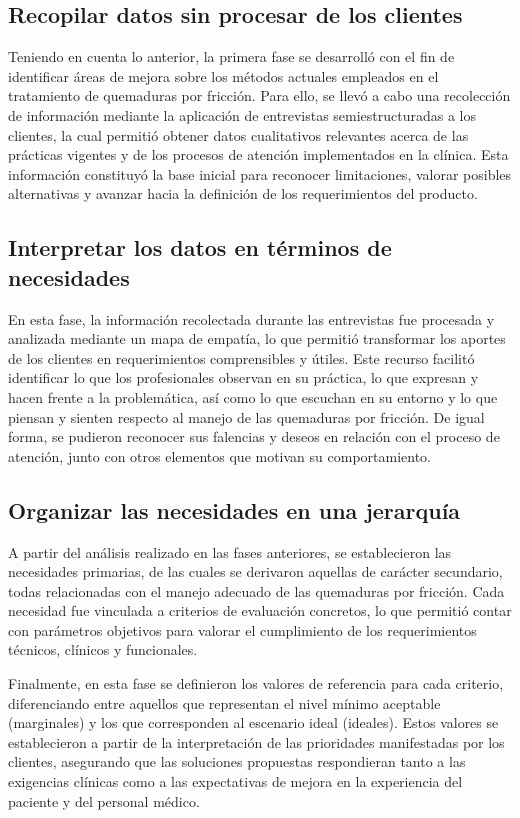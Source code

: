 \documentclass[../../DocumentoCompleto.tex]{subfiles}
\begin{document}
  \subsection{Recopilar datos sin procesar de los clientes}
Teniendo en cuenta lo anterior, la primera fase se desarrolló con el fin de identificar áreas de mejora sobre los métodos actuales empleados en el tratamiento de quemaduras por fricción. Para ello, se llevó a cabo una recolección de información mediante la aplicación de entrevistas semiestructuradas a los clientes, la cual permitió obtener datos cualitativos relevantes acerca de las prácticas vigentes y de los procesos de atención implementados en la clínica. Esta información constituyó la base inicial para reconocer limitaciones, valorar posibles alternativas y avanzar hacia la definición de los requerimientos del producto.
  
  \subsection{Interpretar los datos en términos de necesidades}
En esta fase, la información recolectada durante las entrevistas fue procesada y analizada mediante un mapa de empatía, lo que permitió transformar los aportes de los clientes en requerimientos comprensibles y útiles. Este recurso facilitó identificar lo que los profesionales observan en su práctica, lo que expresan y hacen frente a la problemática, así como lo que escuchan en su entorno y lo que piensan y sienten respecto al manejo de las quemaduras por fricción. De igual forma, se pudieron reconocer sus falencias y deseos en relación con el proceso de atención, junto con otros elementos que motivan su comportamiento.
  
  \subsection{Organizar las necesidades en una jerarquía}
  
     A partir del análisis realizado en las fases anteriores, se establecieron las necesidades primarias, de las cuales se derivaron aquellas de carácter secundario, todas relacionadas con el manejo adecuado de las quemaduras por fricción. Cada necesidad fue vinculada a criterios de evaluación concretos, lo que permitió contar con parámetros objetivos para valorar el cumplimiento de los requerimientos técnicos, clínicos y funcionales.

    Finalmente, en esta fase se definieron los valores de referencia para cada criterio, diferenciando entre aquellos que representan el nivel mínimo aceptable (marginales) y los que corresponden al escenario ideal (ideales). Estos valores se establecieron a partir de la interpretación de las prioridades manifestadas por los clientes, asegurando que las soluciones propuestas respondieran tanto a las exigencias clínicas como a las expectativas de mejora en la experiencia del paciente y del personal médico.
\end{document}
